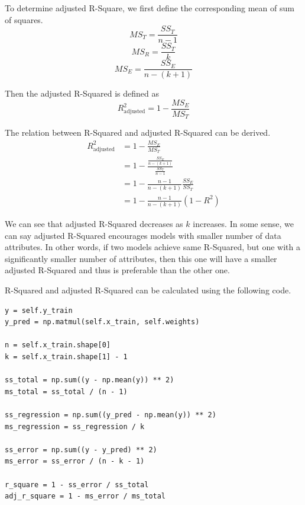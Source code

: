 \documentclass[
	letterpaper
]{article}
\begin{document}
To determine adjusted R-Square, we first define the corresponding mean of sum of squares.
\begin{equation}
MS_T = \frac{SS_T}{n-1}
\end{equation}
\begin{equation}
MS_R = \frac{SS_T}{k}
\end{equation}
\begin{equation}
MS_E = \frac{SS_E}{n-(k+1)}
\end{equation}

Then the adjusted R-Squared is defined as
\begin{equation}
R_{\text{adjusted}}^2 = 1 - \frac{MS_E}{MS_T}
\end{equation}

The relation between R-Squared and adjusted R-Squared can be derived.
\begin{equation}
\begin{split}
R_{\text{adjusted}}^2 &= 1 - \frac{MS_E}{MS_T}\\
& =  1 - \frac{\frac{SS_E}{n-(k+1)}}{\frac{SS_T}{n-1}}\\
& = 1 - \frac{n-1}{n-(k+1)} \frac{SS_E}{SS_T}\\
& = 1 - \frac{n-1}{n-(k+1)} (1-R^2)
\end{split}
\end{equation}

We can see that adjusted R-Squared decreases as $k$ increases.
In some sense, we can say adjusted R-Squared encourages models with smaller number of data attributes.
In other words, if two models achieve same R-Squared, but one with a significantly smaller number of attributes, then this one will have a smaller adjusted R-Squared and thus is preferable than the other one.

R-Squared and adjusted R-Squared can be calculated using the following code.
\begin{lstlisting}
y = self.y_train
y_pred = np.matmul(self.x_train, self.weights)

n = self.x_train.shape[0]
k = self.x_train.shape[1] - 1

ss_total = np.sum((y - np.mean(y)) ** 2)
ms_total = ss_total / (n - 1)

ss_regression = np.sum((y_pred - np.mean(y)) ** 2)
ms_regression = ss_regression / k

ss_error = np.sum((y - y_pred) ** 2)
ms_error = ss_error / (n - k - 1)

r_square = 1 - ss_error / ss_total
adj_r_square = 1 - ms_error / ms_total
\end{lstlisting}
\end{document}

